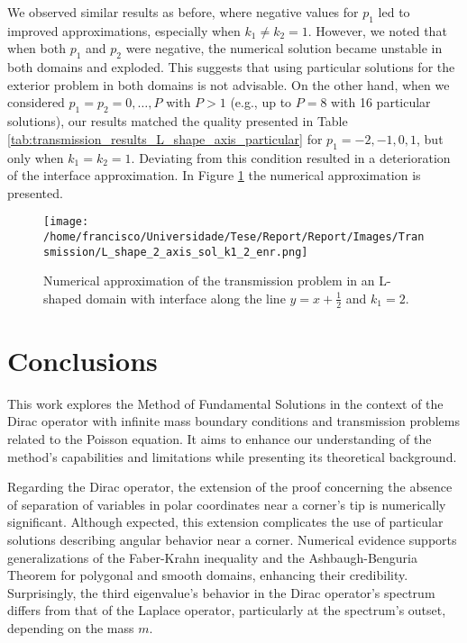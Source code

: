\documentclass[5p,authoryear]{elsarticle}
\begin{document}
We observed similar results as before, where negative values for \(p_1\) led to improved approximations, especially when \(k_1 \neq k_2 = 1\). However, we noted that when both \(p_1\) and \(p_2\) were negative, the numerical solution became unstable in both domains and exploded. This suggests that using particular solutions for the exterior problem in both domains is not advisable. On the other hand, when we considered \(p_1 = p_2 = 0, \dots, P\) with \(P > 1\) (e.g., up to \(P = 8\) with 16 particular solutions), our results matched the quality presented in Table \ref{tab:transmission_results_L_shape_axis_particular} for \(p_1=-2, -1, 0, 1\), but only when \(k_1=k_2=1\). Deviating from this condition resulted in a deterioration of the interface approximation. In Figure \ref{transmission_L_axis_plot_k1_2} the numerical approximation is presented.
\begin{figure}
    \centering
    \texttt{[image: /home/francisco/Universidade/Tese/Report/Report/Images/Transmission/L\_shape\_2\_axis\_sol\_k1\_2\_enr.png]}
    \caption{Numerical approximation of the transmission problem in an L-shaped domain with interface along the line \(y=x+\frac{1}{2}\) and \(k_1=2\).}
    \label{transmission_L_axis_plot_k1_2}
\end{figure}

\section{Conclusions}

This work explores the Method of Fundamental Solutions in the context of the Dirac operator with infinite mass boundary conditions and transmission problems related to the Poisson equation. It aims to enhance our understanding of the method's capabilities and limitations while presenting its theoretical background.

Regarding the Dirac operator, the extension of the proof concerning the absence of separation of variables in polar coordinates near a corner's tip is numerically significant. Although expected, this extension complicates the use of particular solutions describing angular behavior near a corner. Numerical evidence supports generalizations of the Faber-Krahn inequality and the Ashbaugh-Benguria Theorem for polygonal and smooth domains, enhancing their credibility. Surprisingly, the third eigenvalue's behavior in the Dirac operator's spectrum differs from that of the Laplace operator, particularly at the spectrum's outset, depending on the mass \(m\).
\end{document}
